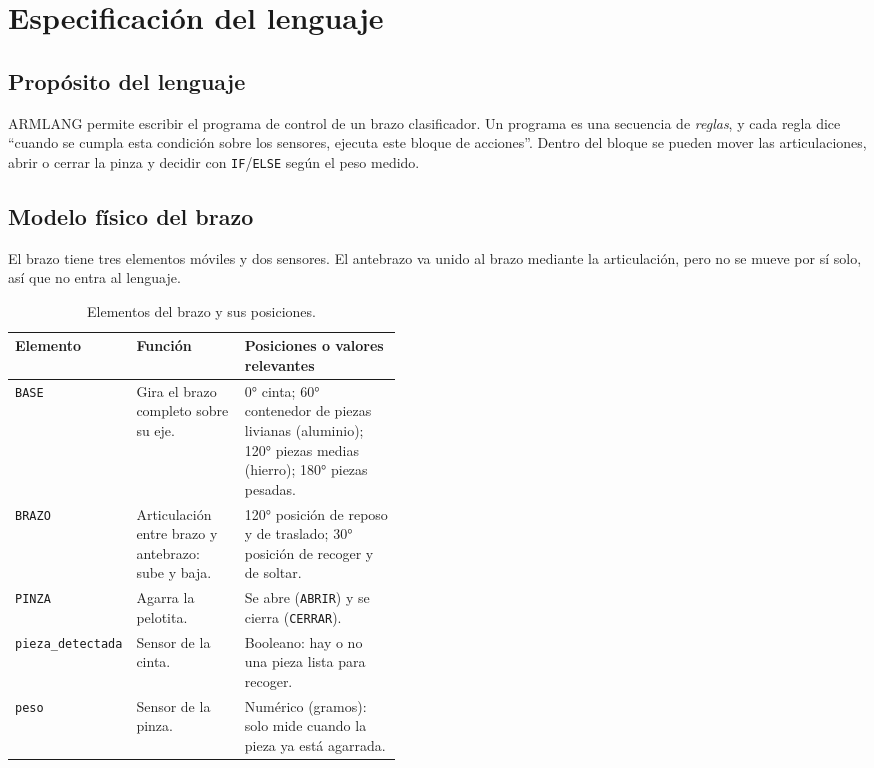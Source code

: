 \documentclass[10pt,a4paper]{article}
\newcommand{\tm}[1]{\texttt{#1}}                                          %
\begin{document}
\section{Especificación del lenguaje}
\label{sec:lenguaje}

\subsection{Propósito del lenguaje}

ARMLANG permite escribir el programa de control de un brazo clasificador. Un
programa es una secuencia de \emph{reglas}, y cada regla dice ``cuando se cumpla
esta condición sobre los sensores, ejecuta este bloque de acciones''. Dentro del
bloque se pueden mover las articulaciones, abrir o cerrar la pinza y decidir con
\tm{IF}/\tm{ELSE} según el peso medido.

\subsection{Modelo físico del brazo}

El brazo tiene tres elementos móviles y dos sensores. El antebrazo va unido al
brazo mediante la articulación, pero no se mueve por sí solo, así que no entra al
lenguaje.

\begin{table}[H]
\centering\small
\begin{tabularx}{\linewidth}{|L{0.17\linewidth}|L{0.28\linewidth}|X|}
\hline
\textbf{Elemento} & \textbf{Función} & \textbf{Posiciones o valores relevantes} \\
\hline
\tm{BASE} & Gira el brazo completo sobre su eje. & 0° cinta; 60° contenedor de piezas livianas (aluminio); 120° piezas medias (hierro); 180° piezas pesadas. \\
\hline
\tm{BRAZO} & Articulación entre brazo y antebrazo: sube y baja. & 120° posición de reposo y de traslado; 30° posición de recoger y de soltar. \\
\hline
\tm{PINZA} & Agarra la pelotita. & Se abre (\tm{ABRIR}) y se cierra (\tm{CERRAR}). \\
\hline
\tm{pieza\_detectada} & Sensor de la cinta. & Booleano: hay o no una pieza lista para recoger. \\
\hline
\tm{peso} & Sensor de la pinza. & Numérico (gramos): solo mide cuando la pieza ya está agarrada. \\
\hline
\end{tabularx}
\caption{Elementos del brazo y sus posiciones.}
\label{tab:brazo}
\end{table}
\end{document}
